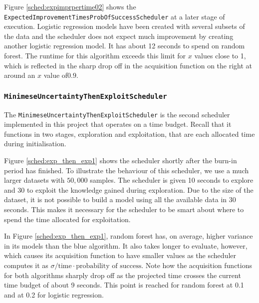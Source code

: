 \documentclass[a4paper,12pt,twoside,openright]{report}
\begin{document}
Figure \ref{sched:expimprpertime02} shows the \texttt{ExpectedImprovementTimesProbOfSuccessScheduler} at a later stage of execution. Logistic regression models have been created with several subsets of the data and the scheduler does not expect much improvement by creating another logistic regression model. It has about 12 seconds to spend on random forest. The runtime for this algorithm exceeds this limit for $x$ values close to 1, which is reflected in the sharp drop off in the acquisition function on the right at around an $x$ value of$0.9$.

\subsubsection{\texttt{MinimeseUncertaintyThenExploitScheduler}}

The \texttt{MinimeseUncertaintyThenExploitScheduler} is the second scheduler implemented in this project that operates on a time budget. Recall that it functions in two stages, exploration and exploitation, that are each allocated time during initialisation.

Figure \ref{sched:exp_then_exp1} shows the scheduler shortly after the burn-in period has finished. To illustrate the behaviour of this scheduler, we use a much larger datasets with $50,000$ samples. The scheduler is given 10 seconds to explore and 30 to exploit the knowledge gained during exploration. Due to the size of the dataset, it is not possible to build a model using all the available data in 30 seconds. This makes it necessary for the scheduler to be smart about where to spend the time allocated for exploitation.


In Figure \ref{sched:exp_then_exp1}, random forest has, on average, higher variance in its models than the blue algorithm. It also takes longer to evaluate, however, which causes its acquisition function to have smaller values as the scheduler computes it as $\sigma/\text{time} \cdot \text{probability of success}$. Note how the acquisition functions for both algorithms sharply drop off as the projected time crosses the current time budget of about 9 seconds. This point is reached for random forest at 0.1 and at 0.2 for logistic regression.
\end{document}
